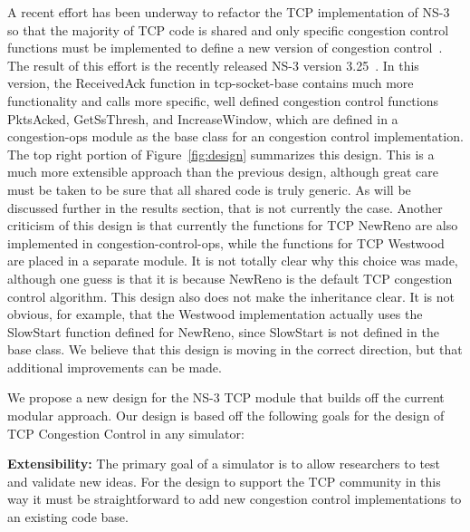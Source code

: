 \documentclass[conference]{IEEEtran}
\begin{document}
A recent effort has been underway to refactor the TCP implementation of NS-3 so that the majority of TCP code is shared and only specific congestion control functions must be implemented to define a new version of congestion control~\cite{NS3Patch}. The result of this effort is the recently released NS-3 version 3.25~\cite{NS325Code}. In this version, the ReceivedAck function in tcp-socket-base contains much more functionality and calls more specific, well defined congestion control functions PktsAcked, GetSsThresh, and IncreaseWindow, which are defined in a congestion-ops module as the base class for an congestion control implementation. The top right portion of Figure~\ref{fig:design} summarizes this design. This is a much more extensible approach than the previous design, although great care must be taken to be sure that all shared code is truly generic. As will be discussed further in the results section, that is not currently the case. Another criticism of this design is that currently the functions for TCP NewReno are also implemented in congestion-control-ops, while the functions for TCP Westwood are placed in a separate module. It is not totally clear why this choice was made, although one guess is that it is because NewReno is the default TCP congestion control algorithm. This design also does not make the inheritance clear. It is not obvious, for example, that the Westwood implementation actually uses the SlowStart function defined for NewReno, since SlowStart is not defined in the base class. We believe that this design is moving in the correct direction, but that additional improvements can be made. 

We propose a new design for the NS-3 TCP module that builds off the current modular approach. Our design is based off the following goals for the design of TCP Congestion Control in any simulator:

\textbf{Extensibility:} The primary goal of a simulator is to allow researchers to test and validate new ideas. For the design to support the TCP community in this way it must be straightforward to add new congestion control implementations to an existing code base.
\end{document}

